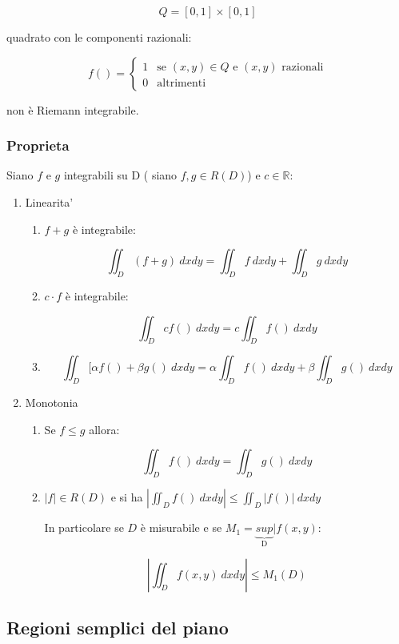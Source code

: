 \documentclass[../appunti-analisi.tex]{subfiles}
\begin{document}
\[
    Q = [0,1] \times [0,1]
\]

quadrato con le componenti razionali:

\[
    f() = \begin{cases}
        1 & \text{se $(x,y) \in Q$ e $(x,y)$ razionali} \\
         0 & \text{altrimenti}
    \end{cases}
\]

non è Riemann integrabile.


\subsubsection{Proprieta}

Siano $f$ e $g$ integrabili su D ( siano $f,g \in R(D)$) e $c \in \mathbb{R}$:

\begin{enumerate}
    \item Linearita'
        \begin{enumerate}
            \item $f+g$ è integrabile:

                \[
                    \iint_D {(f+g)} \: dx d y  = \iint_D {f} \: dx d y + \iint_D {g} \: dx d y 
                \]
            \item $c\cdot f$ è integrabile:

                \[
                    \iint_D {c f()} \: dx  d y = c \iint_D {f()} \: dx  d y 
                \]

            \item \[
                \iint_D {[\alpha f() + \beta g() } \: dx d y = \alpha \iint_D {f()} \: dx d y + \beta \iint_D {g()} \: dx d y 
            \]
        \end{enumerate}

    \item Monotonia
        \begin{enumerate}
            \item Se $f \le g$ allora:

                \[
                    \iint_D {f()} \: dx d y = \iint_D {g()} \: dx d y 
                \]
            \item $|f| \in R(D)$ e si ha $\left|\iint_D {f()} \: dx d y \right| \le \iint_D {\left|f()\right|} \: dx d y  $

                In particolare se $D$ è misurabile e se $M_1= \underbrace{sup}_\text{D} | f(x,y)$:

                \[
                    \left|\iint_D {f(x,y)} \: dx d y\right| \le M_1(D)
                \]

        \end{enumerate}
        
\end{enumerate}


\subsection{Regioni semplici del piano}
\end{document}
